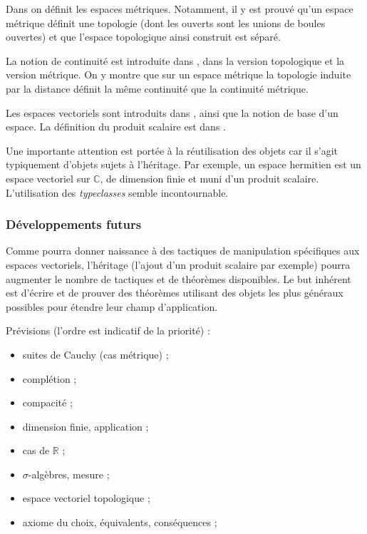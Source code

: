 Dans  on définit les espaces métriques. Notamment, il y est prouvé qu'un espace métrique définit une topologie (dont les ouverts sont les unions de boules ouvertes) et que l'espace topologique ainsi construit est séparé.

La notion de continuité est introduite dans , dans la version topologique et la version métrique. On y montre que sur un espace métrique la topologie induite par la distance définit la même continuité que la continuité métrique.

Les espaces vectoriels sont introduits dans , ainsi que la notion de base d'un espace. La définition du produit scalaire est dans .

Une importante attention est portée à la réutilisation des objets car il s'agit typiquement d'objets sujets à l'héritage. Par exemple, un espace hermitien est un espace vectoriel sur $\mathbb{C}$, de dimension finie et muni d'un produit scalaire. L'utilisation des \emph{typeclasses} semble incontournable.


\subsubsection{Développements futurs}

Comme  pourra donner naissance à des tactiques de manipulation spécifiques aux espaces vectoriels, %
l'héritage (l'ajout d'un produit scalaire par exemple) pourra augmenter le nombre de tactiques et de théorèmes disponibles. Le but inhérent est d'écrire et de prouver des théorèmes utilisant des objets les plus généraux possibles pour étendre leur champ d'application.

Prévisions (l'ordre est indicatif de la priorité) :
\begin{itemize}
  \item suites de Cauchy (cas métrique) ;
  \item complétion ;
  \item compacité ;
  \item dimension finie, application ; %
  \item cas de $\mathbb{R}$ ;
  \item $\sigma$-algèbres, mesure ;
  \item espace vectoriel topologique ; %
  \item axiome du choix, équivalents, conséquences ; %
\end{itemize}

